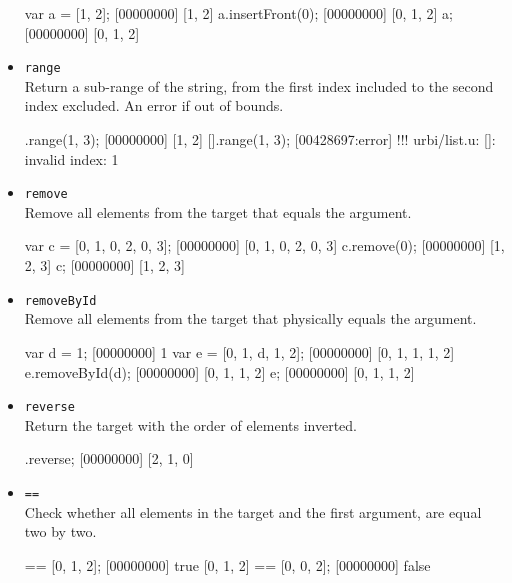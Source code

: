 \begin{itemize}
\begin{urbiscript}[firstnumber=last]
var a = [1, 2];
[00000000] [1, 2]
a.insertFront(0);
[00000000] [0, 1, 2]
a;
[00000000] [0, 1, 2]
\end{urbiscript}

\item \lstinline|range|\\
Return a sub-range of the string, from the first index included to the
second index excluded. An error if out of bounds.

\begin{urbiscript}[firstnumber=last]
[0, 1, 2, 3].range(1, 3);
[00000000] [1, 2]
[].range(1, 3);
[00428697:error] !!! urbi/list.u: []: invalid index: 1
\end{urbiscript}


\item \lstinline|remove|\\
Remove all elements from the target that equals the argument.

\begin{urbiscript}[firstnumber=last]
var c = [0, 1, 0, 2, 0, 3];
[00000000] [0, 1, 0, 2, 0, 3]
c.remove(0);
[00000000] [1, 2, 3]
c;
[00000000] [1, 2, 3]
\end{urbiscript}

\item \lstinline|removeById|\\
Remove all elements from the target that physically equals the
argument.

\begin{urbiscript}[firstnumber=last]
var d = 1;
[00000000] 1
var e = [0, 1, d, 1, 2];
[00000000] [0, 1, 1, 1, 2]
e.removeById(d);
[00000000] [0, 1, 1, 2]
e;
[00000000] [0, 1, 1, 2]
\end{urbiscript}

\item \lstinline|reverse|\\
Return the target with the order of elements inverted.

\begin{urbiscript}[firstnumber=last]
[0, 1, 2].reverse;
[00000000] [2, 1, 0]
\end{urbiscript}

\item \lstinline|==|\\
Check whether all elements in the target and the first argument, are
equal two by two.

\begin{urbiscript}[firstnumber=last]
[0, 1, 2] == [0, 1, 2];
[00000000] true
[0, 1, 2] == [0, 0, 2];
[00000000] false
\end{urbiscript}


\end{itemize}
